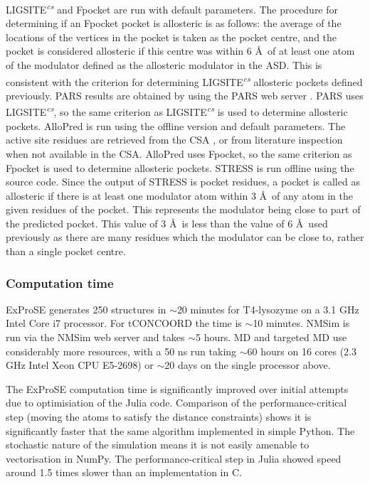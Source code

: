 LIGSITE\textsuperscript{\it cs} \cite{Huang2006} and Fpocket \cite{LeGuilloux2009} are run with default parameters.
The procedure for determining if an Fpocket pocket is allosteric is as follows: the average of the locations of the vertices in the pocket is taken as the pocket centre, and the pocket is considered allosteric if this centre was within 6 \AA\ of at least one atom of the modulator defined as the allosteric modulator in the ASD.
This is consistent with the criterion for determining LIGSITE\textsuperscript{\it cs} allosteric pockets defined previously.
PARS results are obtained by using the PARS web server \cite{Panjkovich2014}.
PARS uses LIGSITE\textsuperscript{\it cs}, so the same criterion as LIGSITE\textsuperscript{\it cs} is used to determine allosteric pockets.
AlloPred is run using the offline version \cite{Greener2015} and default parameters.
The active site residues are retrieved from the CSA \cite{Furnham2014}, or from literature inspection when not available in the CSA.
AlloPred uses Fpocket, so the same criterion as Fpocket is used to determine allosteric pockets.
STRESS \cite{Clarke2016} is run offline using the source code.
Since the output of STRESS is pocket residues, a pocket is called as allosteric if there is at least one modulator atom within 3 \AA\ of any atom in the given residues of the pocket.
This represents the modulator being close to part of the predicted pocket.
This value of 3 \AA\ is less than the value of 6 \AA\ used previously as there are many residues which the modulator can be close to, rather than a single pocket centre.


\subsubsection{Computation time}

ExProSE generates 250 structures in $\sim$20 minutes for T4-lysozyme on a 3.1 GHz Intel Core i7 processor.
For tCONCOORD the time is $\sim$10 minutes.
NMSim is run via the NMSim web server and takes $\sim$5 hours.
MD and targeted MD use considerably more resources, with a 50 ns run taking $\sim$60 hours on 16 cores (2.3 GHz Intel Xeon CPU E5-2698) or $\sim$20 days on the single processor above.

The ExProSE computation time is significantly improved over initial attempts due to optimisiation of the Julia code.
Comparison of the performance-critical step (moving the atoms to satisfy the distance constraints) shows it is significantly faster that the same algorithm implemented in simple Python.
The stochastic nature of the simulation means it is not easily amenable to vectorisation in NumPy.
The performance-critical step in Julia showed speed around 1.5 times slower than an implementation in C.


